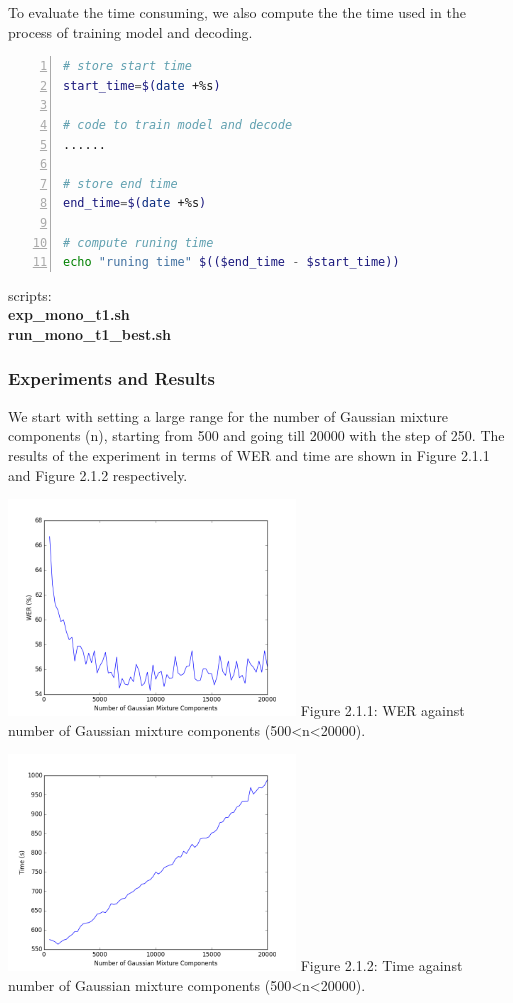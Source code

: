 \documentclass[]{article}
\begin{document}
\begin{multicols*}{2}
To evaluate the time consuming, we also compute the the time used in the process of training model and decoding.

\begin{lstlisting}[language=sh,showstringspaces=false,numbers=left,tabsize=4, xleftmargin=\parindent, frame=single, basicstyle=\tiny] 
# store start time
start_time=$(date +%s)

# code to train model and decode
......

# store end time
end_time=$(date +%s)

# compute runing time
echo "runing time" $(($end_time - $start_time))

\end{lstlisting}

scripts: \textbf{\\ \indent exp\_mono\_t1.sh  \\ \indent run\_mono\_t1\_best.sh}

\subsubsection{Experiments and Results}
We start with setting a large range for the number of Gaussian mixture components (n), starting from 500  and going till 20000 with the step of 250. The results of the experiment in terms of WER and time are shown in Figure 2.1.1 and Figure 2.1.2 respectively.

\begin{center}
\includegraphics[width=3in]{figure_1_WER.png} 
Figure 2.1.1: WER against number of Gaussian mixture components (500<n<20000).
\end{center}

\begin{center}
\includegraphics[width=3in]{figure_1.png} 
Figure 2.1.2: Time against number of Gaussian mixture components (500<n<20000).
\end{center}


\end{multicols*}
\end{document}
